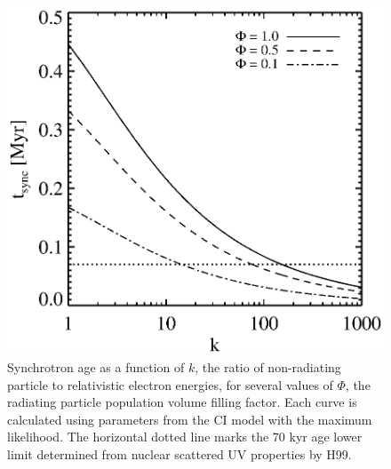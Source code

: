 \begin{figure}
  \begin{center}
    \begin{minipage}{\linewidth}
      \includegraphics*[width=\textwidth, trim=27mm 5mm 35mm 10mm, clip]{tsyn_k.eps}
      \caption{Synchrotron age as a function of $k$, the ratio of
        non-radiating particle to relativistic electron energies, for
        several values of $\Phi$, the radiating particle population
        volume filling factor. Each curve is calculated using
        parameters from the CI model with the maximum likelihood. The
        horizontal dotted line marks the 70 kyr age lower limit
        determined from nuclear scattered UV properties by H99.}
      \label{fig:age}
    \end{minipage}
  \end{center}
\end{figure}


